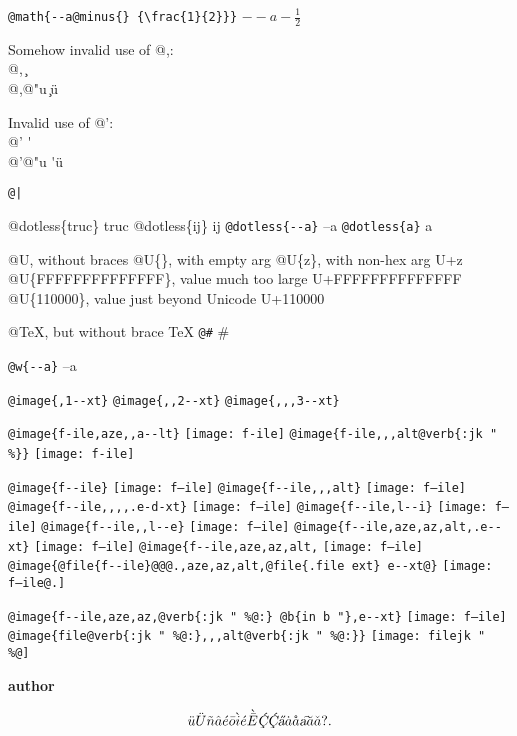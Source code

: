 \documentclass{book}
\renewcommand{\_}{\Texinfounderscore\discretionary{}{}{}}
\renewcommand{\includegraphics}[1]{\fbox{FIG \detokenize{#1}}}
\begin{document}
\begin{titlepage}
\texttt{@math\{{-}{-}a@minus\{\}\ \{\textbackslash{}frac\{1\}\{2\}\}\}} $--a- {\frac{1}{2}}$




Somehow invalid use of @,:\leavevmode{}\\
@, \c{}\leavevmode{}\\
@,@"u \c{}\"{u}

Invalid use of @':\leavevmode{}\\
@' \'{}\leavevmode{}\\
@'@"u \'{}\"{u}

\texttt{@|} 

@dotless\{truc\} truc
@dotless\{ij\} ij
\texttt{@dotless\{{-}{-}a\}} --a
\texttt{@dotless\{a\}} a

@U, without braces @U\{\}, with empty arg 
@U\{z\}, with non-hex arg U+z
@U\{FFFFFFFFFFFFFF\}, value much too large U+FFFFFFFFFFFFFF
@U\{110000\}, value just beyond Unicode U+110000

@TeX, but without brace \TeX{}
\texttt{@\#} \#

\texttt{@w\{{-}{-}a\}} \hbox{--a}

\texttt{@image\{,1{-}{-}xt\}} 
\texttt{@image\{{,}{,}2{-}{-}xt\}} 
\texttt{@image\{{,}{,},3{-}{-}xt\}} 

\texttt{@image\{f-ile,aze{,}{,}a{-}{-}lt\}} \texttt{[image: f-ile]}
\texttt{@image\{f-ile{,}{,},alt@verb\{:jk \_" \%\@\}\}} \texttt{[image: f-ile]}

\texttt{@image\{f{-}{-}ile\}} \texttt{[image: f--ile]}
\texttt{@image\{f{-}{-}ile{,}{,},alt\}} \texttt{[image: f--ile]}
\texttt{@image\{f{-}{-}ile{,}{,}{,}{,}.e-d-xt\}} \texttt{[image: f--ile]}
\texttt{@image\{f{-}{-}ile,l{-}{-}i\}} \texttt{[image: f--ile]}
\texttt{@image\{f{-}{-}ile{,}{,}l{-}{-}e\}} \texttt{[image: f--ile]}
\texttt{@image\{f{-}{-}ile,aze,az,alt,.e{-}{-}xt\}} \texttt{[image: f--ile]}
\texttt{@image\{f{-}{-}ile,aze,az,alt,} \texttt{[image: f--ile]}
\texttt{@image\{@file\{f{-}{-}ile\}@@@.,aze,az,alt,@file\{.file ext\}\ e{-}{-}xt@\}} \texttt{[image: f--ile@.]}

\texttt{@image\{f{-}{-}ile,aze,az,@verb\{:jk \_" \%@:\}\ @b\{in b "\},e{-}{-}xt\}} \texttt{[image: f--ile]}
\texttt{@image\{file@verb\{:jk \_" \%@:\}{,}{,},alt@verb\{:jk \_" \%@:\}\}} \texttt{[image: filejk \_" \\\%@]}


{\bfseries author}%

\[
\ddot{u} \ddot{U} \tilde{n} \hat{a} \acute{e} \bar{o} \grave{i} \acute{e} \grave{\bar{E}}
\textsl{\c{\'{C}}} \textsl{\c{\'{C}}} \textsl{\H{a}} \dot{a} \mathring{a} \textsl{\t{a}}
\breve{a} \check{a}
 ? .
\]


\end{titlepage}
\end{document}
